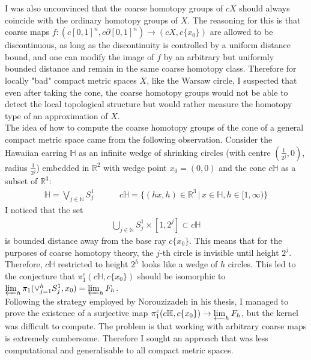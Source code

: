 \documentclass[a4paper,11pt]{article}
\theoremstyle{definition}
\theoremstyle{plain}
\theoremstyle{remark}
\begin{document}
I was also unconvinced that the coarse homotopy groups of $cX$ should always coincide with the ordinary homotopy groups of $X$. The reasoning for this is that coarse maps $f: (c[0,1]^n,c\partial [0,1]^n)\rightarrow (cX,c\{x_0\})$ are allowed to be discontinuous, as long as the discontinuity is controlled by a uniform distance bound, and one can modify the image of $f$ by an arbitrary but uniformly bounded distance and remain in the same coarse homotopy class. Therefore for locally "bad" compact metric spaces $X$, like the Warsaw circle, I suspected that even after taking the cone, the coarse homotopy groups would not be able to detect the local topological structure but would rather measure the homotopy type of an approximation of $X$.\\

The idea of how to compute the coarse homotopy groups of the cone of a general compact metric space came from the following observation. Consider the Hawaiian earring $\mathbb{H}$ as an infinite wedge of shrinking circles (with centre $(\frac{1}{2^{j}},0)$, radius $\frac{1}{2^{j}}$) embedded in $\mathbb{R}^2$ with wedge point $x_0=(0,0)$ and the cone $c\mathbb{H}$ as a subset of $\mathbb{R}^3$:
\begin{align*}
\mathbb{H} = \bigvee_{j \in \mathbb{N}} S^1_{j} \quad \quad \quad c\mathbb{H} = \{(hx,h)\in \mathbb{R}^3\,|\, x\in \mathbb{H}, h\in [1,\infty)\}
\end{align*}  
I noticed that the set 
\begin{align*}
\bigcup_{j\in \mathbb{N}} S^1_{j} \times [1,2^j] \subset c\mathbb{H}
\end{align*}
is bounded distance away from the base ray $c\{x_0\}$. This means that for the purposes of coarse homotopy theory, the $j$-th circle is invisible until height $2^j$. Therefore, $c\mathbb{H}$ restricted to height $2^h$ looks like a wedge of $h$ circles. This led to the conjecture that $\pi_{1}^{c}(c\mathbb{H},c\{x_0\})$ should be isomorphic to $\varprojlim_{h} \pi_{1}(\vee_{j=1}^{h} S^1_{j}, x_0) = \varprojlim_{h} F_{h}$. \\

Following the strategy employed by Norouzizadeh in his thesis, I managed to prove the existence of a surjective map $\pi_{1}^{c}(c\mathbb{H},c\{x_0\})\rightarrow \varprojlim_{h} F_{h}$, but the kernel was difficult to compute. The problem is that working with arbitrary coarse maps is extremely cumbersome. Therefore I sought an approach that was less computational and generalisable to all compact metric spaces. \\
\end{document}
